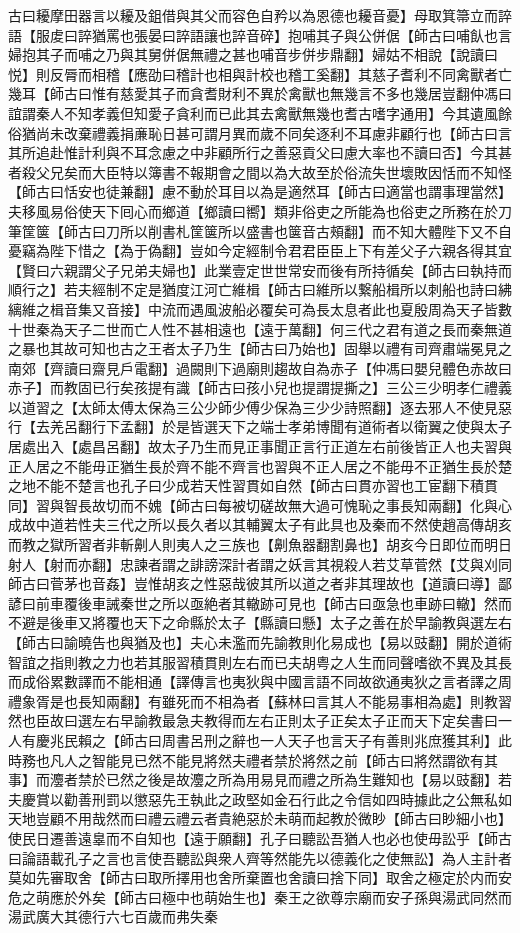 古曰耰摩田器言以耰及鉏借與其父而容色自矜以為恩德也耰音憂】母取箕箒立而誶語【服䖍曰誶猶罵也張晏曰誶語讓也誶音碎】抱哺其子與公併倨【師古曰哺飤也言婦抱其子而哺之乃與其舅併倨無禮之甚也哺音步併步鼎翻】婦姑不相說【說讀曰悦】則反脣而相稽【應劭曰稽計也相與計校也稽工奚翻】其慈子耆利不同禽獸者亡幾耳【師古曰惟有慈愛其子而貪耆財利不異於禽獸也無幾言不多也幾居豈翻仲馮曰誼謂秦人不知孝義但知愛子貪利而已此其去禽獸無幾也耆古嗜字通用】今其遺風餘俗猶尚未改棄禮義捐亷恥日甚可謂月異而歲不同矣逐利不耳慮非顧行也【師古曰言其所追赴惟計利與不耳念慮之中非顧所行之善惡貢父曰慮大率也不讀曰否】今其甚者殺父兄矣而大臣特以簿書不報期會之間以為大故至於俗流失世壞敗因恬而不知怪【師古曰恬安也徒兼翻】慮不動於耳目以為是適然耳【師古曰適當也謂事理當然】夫移風易俗使天下囘心而鄉道【鄉讀曰嚮】類非俗吏之所能為也俗吏之所務在於刀筆筐箧【師古曰刀所以削書札筐箧所以盛書也箧音古頰翻】而不知大體陛下又不自憂竊為陛下惜之【為于偽翻】豈如今定經制令君君臣臣上下有差父子六親各得其宜【賢曰六親謂父子兄弟夫婦也】此業壹定世世常安而後有所持循矣【師古曰執持而順行之】若夫經制不定是猶度江河亡維楫【師古曰維所以繋船楫所以刺船也詩曰紼縭維之楫音集又音接】中流而遇風波船必覆矣可為長太息者此也夏殷周為天子皆數十世秦為天子二世而亡人性不甚相遠也【遠于萬翻】何三代之君有道之長而秦無道之暴也其故可知也古之王者太子乃生【師古曰乃始也】固舉以禮有司齊肅端冕見之南郊【齊讀曰齋見戶電翻】過闕則下過廟則趨故自為赤子【仲馮曰嬰兒體色赤故曰赤子】而教固已行矣孩提有識【師古曰孩小兒也提謂提撕之】三公三少明孝仁禮義以道習之【太師太傅太保為三公少師少傅少保為三少少詩照翻】逐去邪人不使見惡行【去羌呂翻行下孟翻】於是皆選天下之端士孝弟博聞有道術者以衛翼之使與太子居處出入【處昌呂翻】故太子乃生而見正事聞正言行正道左右前後皆正人也夫習與正人居之不能毋正猶生長於齊不能不齊言也習與不正人居之不能毋不正猶生長於楚之地不能不楚言也孔子曰少成若天性習貫如自然【師古曰貫亦習也工宦翻下積貫同】習與智長故切而不媿【師古曰每被切磋故無大過可愧恥之事長知兩翻】化與心成故中道若性夫三代之所以長久者以其輔翼太子有此具也及秦而不然使趙高傳胡亥而教之獄所習者非斬劓人則夷人之三族也【劓魚器翻割鼻也】胡亥今日即位而明日射人【射而亦翻】忠諫者謂之誹謗深計者謂之妖言其視殺人若艾草菅然【艾與刈同師古曰菅茅也音姦】豈惟胡亥之性惡哉彼其所以道之者非其理故也【道讀曰導】鄙諺曰前車覆後車誡秦世之所以亟絶者其轍跡可見也【師古曰亟急也車跡曰轍】然而不避是後車又將覆也天下之命縣於太子【縣讀曰懸】太子之善在於早諭教與選左右【師古曰諭曉告也與猶及也】夫心未濫而先諭教則化易成也【易以豉翻】開於道術智誼之指則教之力也若其服習積貫則左右而已夫胡粤之人生而同聲嗜欲不異及其長而成俗累數譯而不能相通【譯傳言也夷狄與中國言語不同故欲通夷狄之言者譯之周禮象胥是也長知兩翻】有雖死而不相為者【蘇林曰言其人不能易事相為處】則教習然也臣故曰選左右早諭教最急夫教得而左右正則太子正矣太子正而天下定矣書曰一人有慶兆民賴之【師古曰周書呂刑之辭也一人天子也言天子有善則兆庶獲其利】此時務也凡人之智能見已然不能見將然夫禮者禁於將然之前【師古曰將然謂欲有其事】而灋者禁於已然之後是故灋之所為用易見而禮之所為生難知也【易以豉翻】若夫慶賞以勸善刑罰以懲惡先王執此之政堅如金石行此之令信如四時據此之公無私如天地豈顧不用哉然而曰禮云禮云者貴絶惡於未萌而起教於微眇【師古曰眇細小也】使民日遷善遠辠而不自知也【遠于願翻】孔子曰聽訟吾猶人也必也使毋訟乎【師古曰論語載孔子之言也言使吾聽訟與衆人齊等然能先以德義化之使無訟】為人主計者莫如先審取舍【師古曰取所擇用也舍所棄置也舍讀曰捨下同】取舍之極定於内而安危之萌應於外矣【師古曰極中也萌始生也】秦王之欲尊宗廟而安子孫與湯武同然而湯武廣大其德行六七百歲而弗失秦